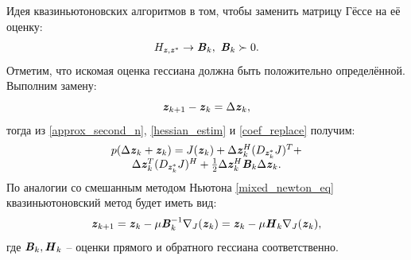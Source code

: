 Идея квазиньютоновских алгоритмов в том, чтобы заменить матрицу Гёссе на её оценку:
\begin{equation}
	H_{\textbf{\textit{z}}, \textbf{\textit{z}}^*}\rightarrow\textbf{\textit{B}}_k, \ \textbf{\textit{B}}_k\succ 0.
	\label{hessian_estim}
\end{equation}
Отметим, что искомая оценка гессиана должна быть положительно определённой. Выполним замену:
\begin{equation}
	\textbf{\textit{z}}_{k+1}-\textbf{\textit{z}}_{k}=\Delta\textbf{\textit{z}}_{k},
	\label{coef_replace}
\end{equation}
тогда из \eqref{approx_second_n}, \eqref{hessian_estim} и \eqref{coef_replace} получим:
\begin{equation}
	\begin{matrix}
		p(\Delta\textbf{\textit{z}}_{k}+\textbf{\textit{z}}_{k})=
		J(\textbf{\textit{z}}_{k})+
		\Delta\textbf{\textit{z}}_{k}^H(D_{\textbf{\textit{z}}^*_{k}}{J})^T+\\
		\Delta\textbf{\textit{z}}_{k}^T(D_{\textbf{\textit{z}}^*_{k}}{J})^H+\frac{1}{2}\Delta\textbf{\textit{z}}_{k}^H
		\textbf{\textit{B}}_{k}\Delta\textbf{\textit{z}}_{k}.
		\label{approx_second_replace_n}
	\end{matrix}
\end{equation}
По аналогии со смешанным методом Ньютона \eqref{mixed_newton_eq} квазиньютоновский метод будет иметь вид:
\begin{equation}
	\textbf{\textit{z}}_{k+1}=\textbf{\textit{z}}_{k}-\mu\textbf{\textit{B}}_{k}^{-1}
	\nabla_{J}(\textbf{\textit{z}}_{k})=
	\textbf{\textit{z}}_{k}-\mu\textbf{\textit{H}}_{k}
	\nabla_{J}(\textbf{\textit{z}}_{k})
	\label{kvazi_newton_alg},
\end{equation}
где $\textbf{\textit{B}}_k, \textbf{\textit{H}}_k$ -- оценки прямого и обратного гессиана соответственно.

